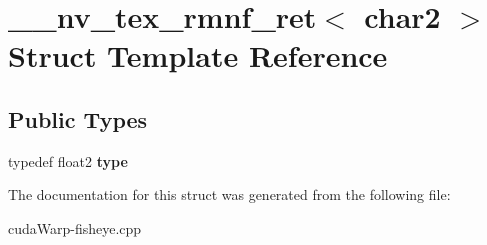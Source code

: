 \hypertarget{struct____nv__tex__rmnf__ret_3_01char2_01_4}{}\section{\+\_\+\+\_\+nv\+\_\+tex\+\_\+rmnf\+\_\+ret$<$ char2 $>$ Struct Template Reference}
\label{struct____nv__tex__rmnf__ret_3_01char2_01_4}
\subsection*{Public Types}
\begin{DoxyCompactItemize}
\item 
typedef float2 {\bfseries type}\hypertarget{struct____nv__tex__rmnf__ret_3_01char2_01_4_a27bf1c8e0abb7010b7b99cb55d80ad8f}{}\label{struct____nv__tex__rmnf__ret_3_01char2_01_4_a27bf1c8e0abb7010b7b99cb55d80ad8f}

\end{DoxyCompactItemize}


The documentation for this struct was generated from the following file\+:\begin{DoxyCompactItemize}
\item 
cuda\+Warp-\/fisheye.\+cpp\end{DoxyCompactItemize}
